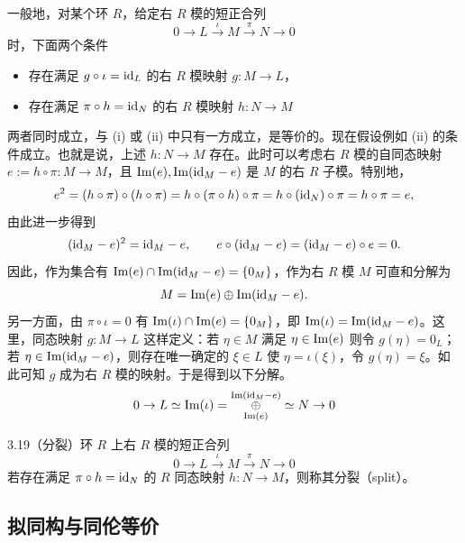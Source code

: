 一般地，对某个环 $R$，给定右 $R$ 模的短正合列
\[
0\to L\xrightarrow{\iota}M\xrightarrow{\pi}N\to 0
\]
时，下面两个条件
\begin{itemize}
\item[(i)] 存在满足 $g\circ\iota=\mathrm{id}_L$ 的右 $R$ 模映射 $g\colon M\to L$，
\item[(ii)] 存在满足 $\pi\circ h=\mathrm{id}_N$ 的右 $R$ 模映射 $h\colon N\to M$
\end{itemize}
两者同时成立，与 (i) 或 (ii) 中只有一方成立，是等价的。现在假设例如 (ii) 的条件成立。也就是说，上述 $h\colon N\to M$ 存在。此时可以考虑右 $R$ 模的自同态映射 $e:=h\circ\pi\colon M\to M$，且 $\operatorname{Im}(e),\operatorname{Im}(\mathrm{id}_M-e)$ 是 $M$ 的右 $R$ 子模。特别地，
\[
e^2=(h\circ\pi)\circ(h\circ\pi)=h\circ(\pi\circ h)\circ\pi=h\circ(\mathrm{id}_N)\circ\pi=h\circ\pi=e,
\]
由此进一步得到
\[
(\mathrm{id}_M-e)^2=\mathrm{id}_M-e,\qquad e\circ(\mathrm{id}_M-e)=(\mathrm{id}_M-e)\circ e=0.
\]
因此，作为集合有 $\operatorname{Im}(e)\cap\operatorname{Im}(\mathrm{id}_M-e)=\{0_M\}$，作为右 $R$ 模 $M$ 可直和分解为
\[
M=\operatorname{Im}(e)\oplus\operatorname{Im}(\mathrm{id}_M-e).
\]
另一方面，由 $\pi\circ\iota=0$ 有 $\operatorname{Im}(\iota)\cap\operatorname{Im}(e)=\{0_M\}$，即 $\operatorname{Im}(\iota)=\operatorname{Im}(\mathrm{id}_M-e)$。这里，同态映射 $g\colon M\to L$ 这样定义：若 $\eta\in M$ 满足 $\eta\in\operatorname{Im}(e)$ 则令 $g(\eta)=0_L$；若 $\eta\in\operatorname{Im}(\mathrm{id}_M-e)$，则存在唯一确定的 $\xi\in L$ 使 $\eta=\iota(\xi)$，令 $g(\eta)=\xi$。如此可知 $g$ 成为右 $R$ 模的映射。于是得到以下分解。
\[
0\to L\simeq\operatorname{Im}(\iota)=\underset{\operatorname{Im}(e)}{\overset{\operatorname{Im}(\mathrm{id}_M-e)}{\oplus}}\simeq N\to 0
\]


\begin{definition}{3.19}（分裂）环 $R$ 上右 $R$ 模的短正合列
\[
0\to L\xrightarrow{\iota}M\xrightarrow{\pi}N\to 0
\]
若存在满足 $\pi\circ h=\mathrm{id}_N$ 的 $R$ 同态映射 $h\colon N\to M$，则称其分裂（split）。
\end{definition}

\subsection{拟同构与同伦等价}

